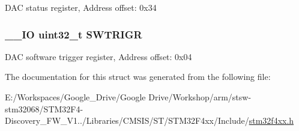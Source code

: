 D\-A\-C status register, Address offset\-: 0x34 \hypertarget{struct_d_a_c___type_def_a896bbb7153af0b67ad772360feaceeb4}{
\subsubsection[{S\-W\-T\-R\-I\-G\-R}]{\setlength{\rightskip}{0pt plus 5cm}\-\_\-\-\_\-\-I\-O uint32\-\_\-t S\-W\-T\-R\-I\-G\-R}}\label{struct_d_a_c___type_def_a896bbb7153af0b67ad772360feaceeb4}
D\-A\-C software trigger register, Address offset\-: 0x04 

The documentation for this struct was generated from the following file\-:\begin{DoxyCompactItemize}
\item 
E\-:/\-Workspaces/\-Google\-\_\-\-Drive/\-Google Drive/\-Workshop/arm/stsw-\/stm32068/\-S\-T\-M32\-F4-\/\-Discovery\-\_\-\-F\-W\-\_\-\-V1../\-Libraries/\-C\-M\-S\-I\-S/\-S\-T/\-S\-T\-M32\-F4xx/\-Include/\hyperlink{stm32f4xx_8h}{stm32f4xx.\-h}\end{DoxyCompactItemize}
